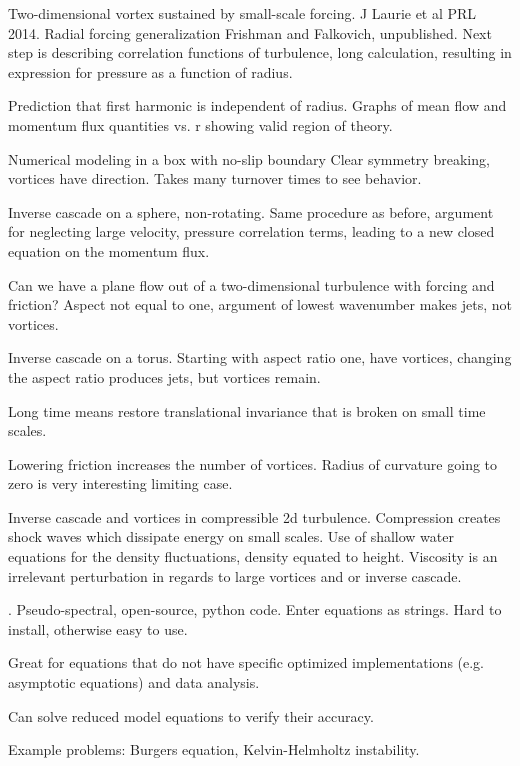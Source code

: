 \begin{description}
{\begin{description}
Two-dimensional vortex sustained by small-scale forcing.
J Laurie et al PRL 2014.
Radial forcing generalization Frishman and Falkovich, unpublished.
Next step is describing correlation functions of turbulence,
long calculation, resulting in expression for pressure
as a function of radius.

Prediction that first harmonic is independent of radius.
Graphs of mean flow and momentum flux quantities vs. r showing
valid region of theory.

Numerical modeling in a box with no-slip boundary
Clear symmetry breaking, vortices have direction. Takes many turnover
times to see behavior.

Inverse cascade on a sphere, non-rotating.
Same procedure as before, argument for neglecting large velocity, pressure
correlation terms, leading to a new closed equation on the momentum flux.

Can we have a plane flow out of a two-dimensional turbulence with
forcing and friction? Aspect not equal to one, argument of lowest
wavenumber makes jets, not vortices.

Inverse cascade on a torus. Starting with aspect ratio one, have vortices,
changing the aspect ratio produces jets, but vortices remain.

Long time means restore translational invariance that is broken on small
time scales.

Lowering friction increases the number of vortices.
Radius of curvature going to zero is very interesting limiting case.

Inverse cascade and vortices in compressible 2d turbulence.
Compression creates shock waves which dissipate energy on small scales.
Use of shallow water equations for the density fluctuations, density
equated to height.
Viscosity is an irrelevant perturbation in regards to large vortices
and or inverse cascade.

\item[D. Lecoanet: Introduction to Dedalus]
.
Pseudo-spectral, open-source, python code. Enter equations as strings.
Hard to install, otherwise easy to use.

Great for equations that do not have specific optimized
implementations (e.g. asymptotic equations) and data analysis.

Can solve reduced model equations to verify their accuracy.

Example problems: Burgers equation, Kelvin-Helmholtz instability.


\end{description}}
\end{description}
